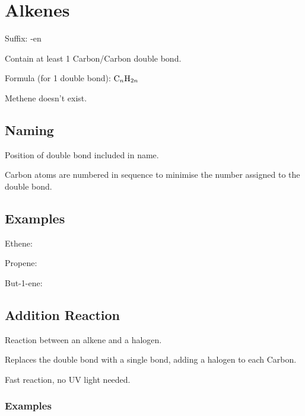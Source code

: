 \documentclass[a4paper,11pt]{article}
\begin{document}
\section{Alkenes}

Suffix: -en

Contain at least 1 Carbon/Carbon double bond.

Formula (for 1 double bond): $\ce{C_{n}H_{2n}}$

Methene doesn't exist.


\subsection{Naming}

Position of double bond included in name.

Carbon atoms are numbered in sequence to minimise the number assigned to the
double bond.


\subsection{Examples}

Ethene:

\begin{center}
\end{center}

Propene:

\begin{center}
\end{center}

But-1-ene:

\begin{center}
\end{center}


\subsection{Addition Reaction}

Reaction between an alkene and a halogen.

Replaces the double bond with a single bond, adding a halogen to each Carbon.

Fast reaction, no UV light needed.


\subsubsection{Examples}
\end{document}
